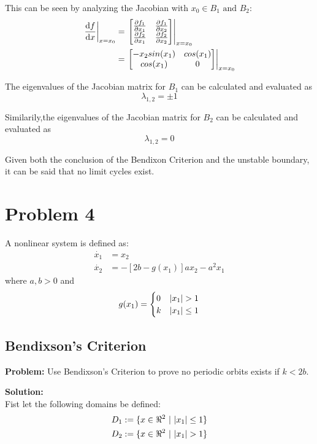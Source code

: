 \documentclass[letter]{article}
\begin{document}
This can be seen by analyzing the Jacobian with $x_0 \in B_1 \text{ and } B_2$:
\begin{align}
	\eval{\dv{f}{x}}_{x=x_0} 
	&= \eval{\mqty[\pdv{f_1}{x_1} & \pdv{f_1}{x_2}\\
		\pdv{f_2}{x_1} & \pdv{f_2}{x_2}]}_{x=x_0}\\
	&= \eval{\mqty[-x_2 sin(x_1) & cos(x_1)\\ cos(x_1) & 0]}_{x=x_0}
\end{align}

The eigenvalues of the Jacobian matrix for $B_1$ can be calculated and evaluated as
\begin{equation}
	\lambda_{1,2} = \pm 1
\end{equation}

Similarily,the eigenvalues of the Jacobian matrix for $B_2$ can be calculated and evaluated as
\begin{equation}
	\lambda_{1,2} = 0
\end{equation}

Given both the conclusion of the Bendixon Criterion and the unstable boundary, it can be said that no limit cycles exist.




\newpage
\section{Problem 4}
A nonlinear system is defined as:
\begin{equation}
	\begin{aligned}
		\dot{x_1} &= x_2\\
		\dot{x_2} &= -[2b - g(x_1)]ax_2 - a^2 x_1
	\end{aligned}
\end{equation}
where $a,b>0$ and
\begin{equation}
	g(x_1) = 
	\begin{cases}
		0 & \abs{x_1} > 1\\
		k & \abs{x_1} \leq 1
	\end{cases}
\end{equation}

\subsection{Bendixson's Criterion}
\textbf{Problem:}
Use Bendixson's Criterion to prove no periodic orbits exists if $k < 2b$.

\noindent
\textbf{Solution:}\\
Fist let the following domains be defined:
\begin{equation}
	\begin{aligned}
		D_1 := \{x \in \real^2 \ | \ \abs{x_1} \leq 1\}\\
		D_2 := \{x \in \real^2 \ | \ \abs{x_1} > 1\}
	\end{aligned}
\end{equation}
\end{document}

